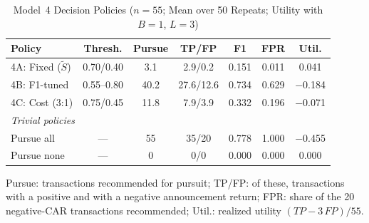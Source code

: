 \begin{table}[!t]
\caption{Model~4 Decision Policies ($n=55$; Mean over 50 Repeats; Utility with $B=1$, $L=3$)}
\label{tab:model4}
\centering
\footnotesize
\setlength{\tabcolsep}{2.5pt}
\begin{tabular}{lcccccc}
\toprule
\textbf{Policy} & \textbf{Thresh.} & \textbf{Pursue} & \textbf{TP/FP} & \textbf{F1} & \textbf{FPR} & \textbf{Util.} \\
\midrule
4A: Fixed ($\tilde S$) & 0.70/0.40 & 3.1 & 2.9/0.2 & 0.151 & 0.011 & 0.041 \\
4B: F1-tuned & 0.55--0.80 & 40.2 & 27.6/12.6 & 0.734 & 0.629 & $-$0.184 \\
4C: Cost (3:1) & 0.75/0.45 & 11.8 & 7.9/3.9 & 0.332 & 0.196 & $-$0.071 \\
\midrule
\multicolumn{7}{l}{\textit{Trivial policies}} \\
Pursue all & --- & 55 & 35/20 & 0.778 & 1.000 & $-$0.455 \\
Pursue none & --- & 0 & 0/0 & 0.000 & 0.000 & 0.000 \\
\bottomrule
\end{tabular}
\par\vspace{2pt}\parbox{0.94\columnwidth}{\scriptsize Pursue: transactions recommended for pursuit; TP/FP: of these, transactions with a
positive and with a negative announcement return; FPR: share of the 20 negative-CAR transactions recommended; Util.: realized
utility $(TP - 3\,FP)/55$.}
\end{table}
